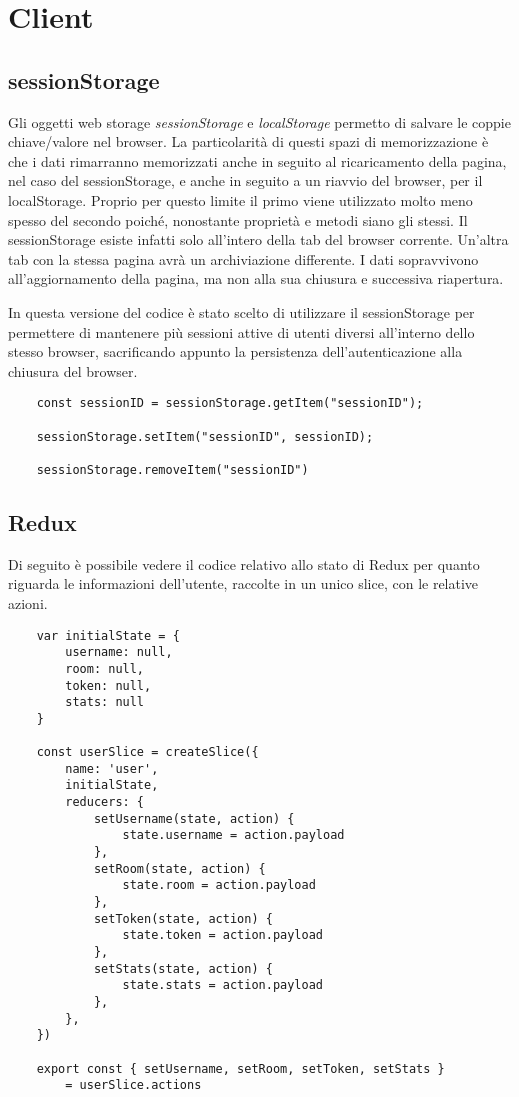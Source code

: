 \section{Client}

\subsection{sessionStorage}

Gli oggetti web storage \emph{sessionStorage} e \emph{localStorage} permetto di salvare le coppie chiave/valore nel browser. La particolarità di questi spazi di memorizzazione è che i dati rimarranno memorizzati anche in seguito al ricaricamento della pagina, nel caso del sessionStorage, e anche in seguito a un riavvio del browser, per il localStorage. Proprio per questo limite il primo viene utilizzato molto meno spesso del secondo poiché, nonostante proprietà e metodi siano gli stessi. Il sessionStorage esiste infatti solo all'intero della tab del browser corrente. Un’altra tab con la stessa pagina avrà un archiviazione differente. I dati sopravvivono all'aggiornamento della pagina, ma non alla sua chiusura e successiva riapertura.

In questa versione del codice è stato scelto di utilizzare il sessionStorage per permettere di mantenere più sessioni attive di utenti diversi all'interno dello stesso browser, sacrificando appunto la persistenza dell'autenticazione alla chiusura del browser.

\begin{verbatim}
    const sessionID = sessionStorage.getItem("sessionID");
    
    sessionStorage.setItem("sessionID", sessionID);

    sessionStorage.removeItem("sessionID")
\end{verbatim}

\subsection{Redux}

Di seguito è possibile vedere il codice relativo allo stato di Redux per quanto riguarda le informazioni dell'utente, raccolte in un unico slice, con le relative azioni.

\begin{verbatim}
    var initialState = {
        username: null,
        room: null,
        token: null,
        stats: null
    }
    
    const userSlice = createSlice({
        name: 'user',
        initialState,
        reducers: {
            setUsername(state, action) {
                state.username = action.payload
            },
            setRoom(state, action) {
                state.room = action.payload
            },
            setToken(state, action) {
                state.token = action.payload
            },
            setStats(state, action) {
                state.stats = action.payload
            },
        },
    })
    
    export const { setUsername, setRoom, setToken, setStats } 
        = userSlice.actions
\end{verbatim}
